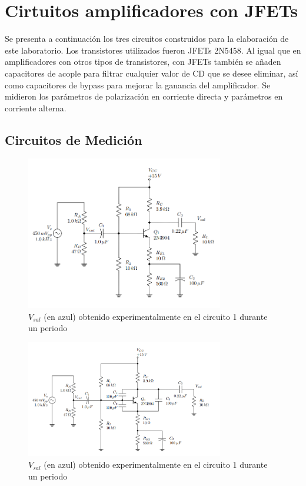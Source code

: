\documentclass[journal]{IEEEtran}
\begin{document}
\section{Cirtuitos amplificadores con JFETs}
Se presenta a continuación los tres circuitos construidos para la elaboración de este laboratorio. Los transistores utilizados fueron JFETs 2N5458. Al igual que en
amplificadores con otros tipos de transistores, con JFETs también se añaden capacitores de acople para filtrar
cualquier valor de CD que se desee eliminar, así como capacitores de bypass para mejorar la ganancia del amplificador.
Se midieron los parámetros de polarización en corriente directa y parámetros en corriente alterna.


\subsection{Circuitos de Medición}

\begin{figure}[H]
        \centering
        \includegraphics[width=3.4in]{Circuito1.png}
        \caption{$V_{sal}$ (en azul) obtenido experimentalmente en el circuito 1 durante un periodo}
        \label{fig:SignalExperimental_024}
\end{figure}

\begin{figure}[H]
        \centering
        \includegraphics[width=3.4in]{Circuito2.png}
        \caption{$V_{sal}$ (en azul) obtenido experimentalmente en el circuito 1 durante un periodo}
        \label{fig:SignalExperimental_044}
\end{figure}
\end{document}

